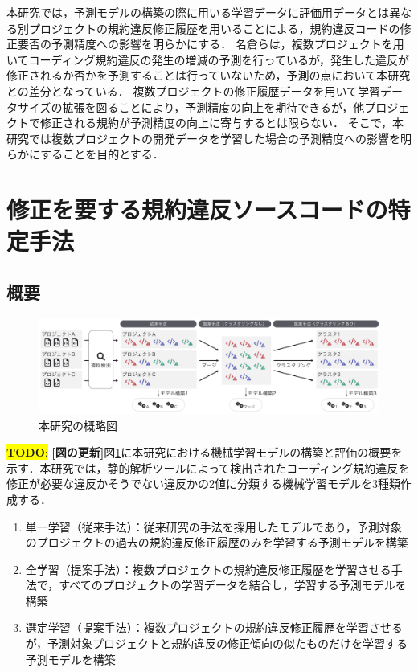 \documentclass[paper]{ieicej}
\newcommand{\todo}[1]{\colorbox{yellow}{{\bf TODO}:}{\color{red} {\textbf{[#1]}}}}
\begin{document}
本研究では，予測モデルの構築の際に用いる学習データに評価用データとは異なる別プロジェクトの規約違反修正履歴を用いることによる，規約違反コードの修正要否の予測精度への影響を明らかにする．
名倉らは，複数プロジェクトを用いてコーディング規約違反の発生の増減の予測を行っているが，発生した違反が修正されるか否かを予測することは行っていないため，予測の点において本研究との差分となっている\cite{nagura}．
複数プロジェクトの修正履歴データを用いて学習データサイズの拡張を図ることにより，予測精度の向上を期待できるが，他プロジェクトで修正される規約が予測精度の向上に寄与するとは限らない．
そこで，本研究では複数プロジェクトの開発データを学習した場合の予測精度への影響を明らかにすることを目的とする．

\section{修正を要する規約違反ソースコードの特定手法}\label{chap:approach}

\subsection{概要}

\begin{figure}[t]
	\centering
	\includegraphics[width=0.8\linewidth]{fig/kameoka_fig1.pdf}
	\caption{本研究の概略図}
	\label{fig:Teiannsyuhou}
\end{figure}

\todo{図の更新}図\ref{fig:Teiannsyuhou}に本研究における機械学習モデルの構築と評価の概要を示す．本研究では，静的解析ツールによって検出されたコーディング規約違反を修正が必要な違反かそうでない違反かの2値に分類する機械学習モデルを3種類作成する．

\begin{enumerate}
  \item 単一学習（従来手法）：従来研究の手法を採用したモデルであり，予測対象のプロジェクトの過去の規約違反修正履歴のみを学習する予測モデルを構築\cite{JyuraiPre}
  \item 全学習（提案手法）：複数プロジェクトの規約違反修正履歴を学習させる手法で，すべてのプロジェクトの学習データを結合し，学習する予測モデルを構築
  \item 選定学習（提案手法）：複数プロジェクトの規約違反修正履歴を学習させるが，予測対象プロジェクトと規約違反の修正傾向の似たものだけを学習する予測モデルを構築
\end{enumerate}
\end{document}
